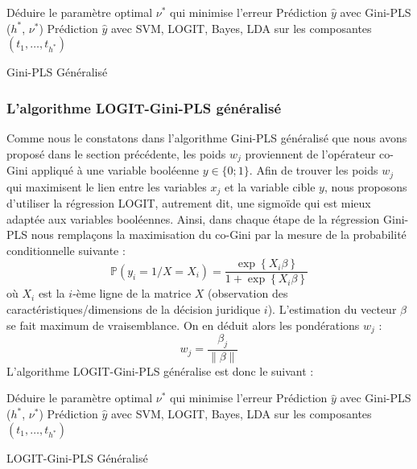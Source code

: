 \begin{algorithm}[H]
	\scriptsize
	Déduire le paramètre optimal $\nu^*$ qui minimise l'erreur \; 
	\Return Prédiction $\hat{y}$ avec Gini-PLS ($h^*$, $\nu^*$) \;
	\Return Prédiction $\hat{y}$ avec SVM, LOGIT, Bayes, LDA sur les composantes $(t_1,\ldots,t_{h^*})$\;
	\caption{Gini-PLS Généralisé}\label{G-GPLS}
\end{algorithm}
\bigskip

\subsubsection{L'algorithme LOGIT-Gini-PLS généralisé} 
\label{sec:sensresultat:logit-gini-pls}
Comme nous le constatons dans l'algorithme Gini-PLS généralisé que nous avons proposé dans le section précédente, les poids $w_j$ proviennent de l'opérateur co-Gini appliqué à une variable booléenne $y \in \lbrace 0;1 \rbrace$. Afin de trouver les poids $w_j$ qui maximisent le lien entre les variables $x_j$ et la variable cible $y$, nous proposons d'utiliser la régression LOGIT, autrement dit, une sigmoïde qui est mieux adaptée aux variables booléennes. Ainsi, dans chaque étape de la régression Gini-PLS nous remplaçons la maximisation du co-Gini par la mesure de la probabilité conditionnelle suivante :
\begin{equation}\tag{LOGIT}
\mathbb{P}(y_i = 1 / X = X_i) = \frac{\exp\left\{X_i \beta \right\}}{1+\exp\left\{ X_i \beta \right\}}
\end{equation}
où $X_i$ est la $i$-ème ligne de la matrice $X$ (observation des caractéristiques/dimensions de la décision juridique $i$). L'estimation du vecteur $\beta$ se fait maximum de vraisemblance. On en déduit alors les pondérations $w_j$ :
\[
w_j = \frac{\beta_j}{\| \beta\|}
\]
L'algorithme LOGIT-Gini-PLS généralise est donc le suivant :

\begin{algorithm}[H]
	\scriptsize
	Déduire le paramètre optimal $\nu^*$ qui minimise l'erreur \; 
	\Return Prédiction $\hat{y}$ avec Gini-PLS ($h^*$, $\nu^*$) \;
	\Return Prédiction $\hat{y}$ avec SVM, LOGIT, Bayes, LDA sur les composantes $(t_1,\ldots,t_{h^*})$\;
	\caption{LOGIT-Gini-PLS Généralisé}\label{G-GPLS}
\end{algorithm}


